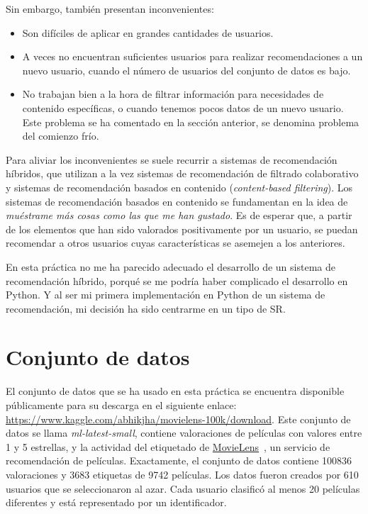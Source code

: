 \documentclass{uimppracticas}
\begin{document}
Sin embargo, también presentan inconvenientes:

\begin{itemize}
	\item Son difíciles de aplicar en grandes cantidades de usuarios.
	\item A veces no encuentran suficientes usuarios para realizar recomendaciones a un nuevo usuario, cuando el número de usuarios del conjunto de datos es bajo.
	\item No trabajan bien a la hora de filtrar información para necesidades de contenido específicas, o cuando tenemos pocos datos de un nuevo usuario. Este problema se ha comentado en la sección anterior, se denomina problema del comienzo frío.
\end{itemize}

Para aliviar los inconvenientes se suele recurrir a sistemas de recomendación híbridos, que utilizan a la vez sistemas de recomendación de filtrado colaborativo y sistemas de recomendación basados en contenido (\textit{content-based filtering}). Los sistemas de recomendación basados en contenido se fundamentan en la idea de \textit{muéstrame más cosas como las que me han gustado}. Es de esperar que, a partir de los elementos que han sido valorados positivamente por un usuario, se puedan recomendar a otros usuarios cuyas características se asemejen a los anteriores. 

En esta práctica no me ha parecido adecuado el desarrollo de un sistema de recomendación híbrido, porqué se me podría haber complicado el desarrollo en Python. Y al ser mi primera implementación en Python de un sistema de recomendación, mi decisión ha sido centrarme en un tipo de SR.

\section{Conjunto de datos}\label{conjunto_datos}

El conjunto de datos que se ha usado en esta práctica se encuentra disponible públicamente para su descarga en el siguiente enlace: \url{https://www.kaggle.com/abhikjha/movielens-100k/download}. Este conjunto de datos se llama \textit{ml-latest-small}, contiene valoraciones de películas con valores entre 1 y 5 estrellas, y la actividad del etiquetado de \href{http://movielens.org}{MovieLens}~\cite{MovieLens}, un servicio de recomendación de películas. Exactamente, el conjunto de datos contiene 100836 valoraciones y 3683 etiquetas de 9742 películas. Los datos fueron creados por 610 usuarios que se seleccionaron al azar. Cada usuario clasificó al menos 20 películas diferentes y está representado por un identificador.
\end{document}
